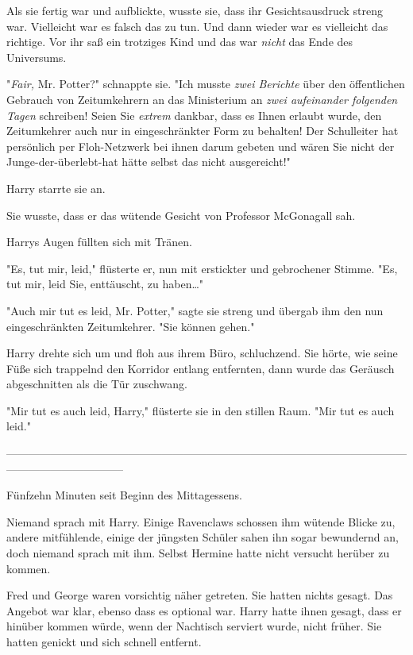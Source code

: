 {Als sie fertig war und aufblickte, wusste sie, dass ihr Gesichtsausdruck streng war. Vielleicht war es falsch das zu tun. Und dann wieder war es vielleicht das richtige. Vor ihr saß ein trotziges Kind und das war \emph{nicht} das Ende des Universums.

"\emph{Fair,} Mr. Potter?" schnappte sie. "Ich musste \emph{zwei Berichte} über den öffentlichen Gebrauch von Zeitumkehrern an das Ministerium an \emph{zwei aufeinander folgenden Tagen} schreiben! Seien Sie \emph{extrem} dankbar, dass es Ihnen erlaubt wurde, den Zeitumkehrer auch nur in eingeschränkter Form zu behalten! Der Schulleiter hat persönlich per Floh-Netzwerk bei ihnen darum gebeten und wären Sie nicht der Junge-der-überlebt-hat hätte selbst das nicht ausgereicht!"

Harry starrte sie an.

Sie wusste, dass er das wütende Gesicht von Professor McGonagall sah.

Harrys Augen füllten sich mit Tränen.

"Es, tut mir, leid," flüsterte er, nun mit erstickter und gebrochener Stimme. "Es, tut mir, leid Sie, enttäuscht, zu haben…"

"Auch mir tut es leid, Mr. Potter," sagte sie streng und übergab ihm den nun eingeschränkten Zeitumkehrer. "Sie können gehen."

Harry drehte sich um und floh aus ihrem Büro, schluchzend. Sie hörte, wie seine Füße sich trappelnd den Korridor entlang entfernten, dann wurde das Geräusch abgeschnitten als die Tür zuschwang.

"Mir tut es auch leid, Harry," flüsterte sie in den stillen Raum. "Mir tut es auch leid."

--------------------------------------------------------------------------------------------------------------------------------------------

Fünfzehn Minuten seit Beginn des Mittagessens.

Niemand sprach mit Harry. Einige Ravenclaws schossen ihm wütende Blicke zu, andere mitfühlende, einige der jüngsten Schüler sahen ihn sogar bewundernd an, doch niemand sprach mit ihm. Selbst Hermine hatte nicht versucht herüber zu kommen.

Fred und George waren vorsichtig näher getreten. Sie hatten nichts gesagt. Das Angebot war klar, ebenso dass es optional war. Harry hatte ihnen gesagt, dass er hinüber kommen würde, wenn der Nachtisch serviert wurde, nicht früher. Sie hatten genickt und sich schnell entfernt.

}
